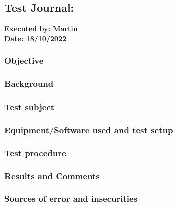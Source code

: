 \subsection{Test Journal: } \label{app:tj_01}

\textbf{Executed by: Martin} \\
\textbf{Date: 18/10/2022}

\subsubsection{Objective}


\subsubsection{Background}


\subsubsection{Test subject}


\subsubsection{Equipment/Software used and test setup}


\subsubsection{Test procedure}


\subsubsection{Results and Comments}


\subsubsection{Sources of error and insecurities}
